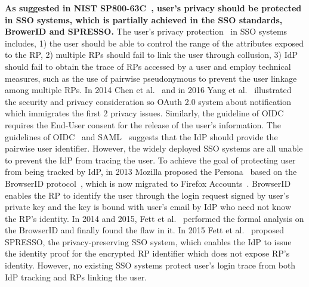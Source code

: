 \textbf{As suggested in NIST SP800-63C~\cite{NIST2017draft}, user's privacy should be protected in SSO systems, which is partially achieved in the SSO standards, BrowerID and SPRESSO.}
The user's privacy protection~\cite{NIST2017draft} in SSO systems includes, 1) the user should be able to control the range of the attributes exposed to the RP, 2) multiple RPs should fail to link the user through collusion, 3) IdP should fail to obtain the trace of RPs accessed by a user and employ technical measures, such as the use of pairwise pseudonymous to prevent the user linkage among multiple RPs.
In 2014 Chen et al.~\cite{ChenPCTKT14} and in 2016 Yang et al.~\cite{YangLLZH16} illustrated the security and privacy consideration so OAuth 2.0 system about notification which immigrates the first 2 privacy issues. Similarly, the guideline of OIDC~\cite{OpenIDConnect} requires the End-User consent for the release of the user's information.
The guidelines of OIDC~\cite{OpenIDConnect} and SAML~\cite{SAML} suggests that the IdP should provide the pairwise user identifier.
However, the widely deployed SSO systems are all unable to prevent the IdP from tracing the user. To achieve the goal of protecting user from being tracked by IdP, in 2013 Mozilla proposed the Persona~\cite{persona} based on the BrowserID protocol~\cite{BrowserID}, which is now migrated to Firefox Accounts~\cite{FirefoxAccount}. BrowserID enables the RP to identify the user through the login request signed by user's private key and the key is bound with user's email by IdP who need not know the  RP's identity. In 2014 and 2015, Fett et al.~\cite{FettKS14, BrowserID} performed the formal analysis on the BrowserID and finally found the flaw in it. In 2015 Fett et al.~\cite{SPRESSO} proposed SPRESSO, the privacy-preserving SSO system, which enables the IdP to issue the identity proof for the encrypted RP identifier which does not expose RP's identity. However, no existing SSO systems protect user's login trace from both IdP tracking and RPs linking the user.

